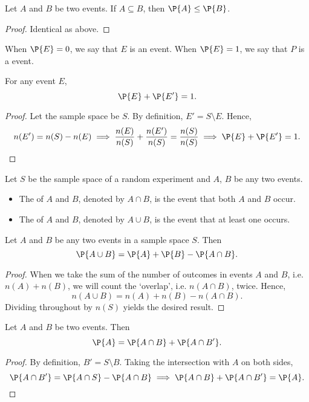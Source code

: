 \begin{corollary}
    Let $A$ and $B$ be two events. If $A \subseteq B$, then $\P{A} \leq \P{B}$.
\end{corollary}
\begin{proof}
    Identical as above.
\end{proof}

\begin{definition}
    When $\P{E} = 0$, we say that $E$ is an  event. When $\P{E} = 1$, we say that $P$ is a  event.
\end{definition}

\begin{proposition}
    For any event $E$, \[\P{E} + \P{E'} = 1.\]
\end{proposition}
\begin{proof}
    Let the sample space be $S$. By definition, $E' = S \setminus E$. Hence, \[n(E') = n(S) - n(E) \implies \frac{n(E)}{n(S)} + \frac{n(E')}{n(S)} = \frac{n(S)}{n(S)} \implies \P{E} + \P{E'} = 1.\]
\end{proof}

\begin{definition}
    Let $S$ be the sample space of a random experiment and $A$, $B$ be any two events.
    \begin{itemize}
        \item The  of $A$ and $B$, denoted by $A \cap B$, is the event that both $A$ and $B$ occur.
        \item The  of $A$ and $B$, denoted by $A \cup B$, is the event that at least one occurs.
    \end{itemize}
\end{definition}

\begin{proposition}
    Let $A$ and $B$ be any two events in a sample space $S$. Then \[\P{A \cup B} = \P{A} + \P{B} - \P{A \cap B}.\]
\end{proposition}
\begin{proof}
    When we take the sum of the number of outcomes in events $A$ and $B$, i.e. $n(A) + n(B)$, we will count the `overlap', i.e. $n(A \cap B)$, twice. Hence, \[n(A \cup B) = n(A) + n(B) - n(A \cap B).\] Dividing throughout by $n(S)$ yields the desired result.
\end{proof}

\begin{proposition}
    Let $A$ and $B$ be two events. Then \[\P{A} = \P{A \cap B} + \P{A \cap B'}.\]
\end{proposition}
\begin{proof}
    By definition, $B' = S \setminus B$. Taking the intersection with $A$ on both sides, \[\P{A \cap B'} = \P{A \cap S} - \P{A \cap B} \implies \P{A \cap B} + \P{A \cap B'} = \P{A}.\]
\end{proof}

